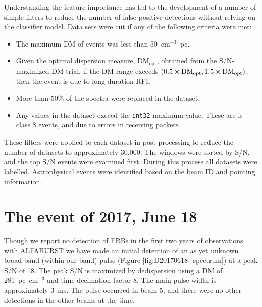 \documentclass[a4paper,fleqn,usenatbib]{mnras}
\begin{document}
Understanding the feature importance has led to the development of a
number of simple filters to reduce the number of false-positive detections
without relying on the classifier model. Data sets were cut if any of the
following criteria were met:

\begin{itemize}
    \item The maximum DM of events was less than 50~cm$^{-3}$~pc.
    \item Given the optimal dispersion measure, DM$_{\textrm{opt}}$, obtained
    from the S/N-maximized DM trial, if the DM range exceeds $(0.5 \times {\rm
    DM}_{\textrm{opt}}, 1.5 \times {\rm DM}_{\textrm{opt}})$, then the event is
    due to long duration RFI.
    \item More than 50\% of the spectra were replaced in the dataset.
    \item Any values in the dataset exceed the \texttt{int32} maximum value.
    These are is class 8 events, and due to errors in receiving packets.
\end{itemize}

These filters were applied to each dataset in post-processing to reduce the
number of datasets to approximately 30,000. The windows were sorted by S/N, and
the top S/N events were examined first.  During this process all datasets were
labelled.  Astrophysical events were identified based on the beam ID and
pointing information.



\section{The event of 2017, June 18}
\label{sec:18062017}

Though we report no detection of FRBs in the first two years of observations
with ALFABURST we have made an initial detection of an as yet unknown broad-band
(within our band) pulse (Figure \ref{fig:D20170618_spectrum}) at a peak S/N of
18. The peak S/N is maximized by dedispersion using a DM of 281~pc~cm$^{-3}$ and
time decimation factor 8. The main pulse width is approximately 3~ms. The pulse
occurred in beam 5, and there were no other detections in the other beams at the
time.
\end{document}
